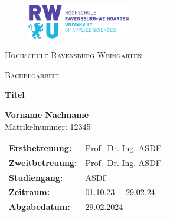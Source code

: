 \documentclass[a4paper, 12pt]{article}
\numberwithin{figure}{subsection}
\numberwithin{equation}{subsection}
\numberwithin{table}{subsection}
\begin{document}
\thispagestyle{empty} %


\begin{titlingpage}
    \begin{center}
        \begin{figure}[t]
            \centering
            \includegraphics[width=0.4\textwidth]{media/logos/rwu_logo.pdf}
            \hfill
        \end{figure}
        \vspace*{1.5cm}
            {\scshape\LARGE Hochschule Ravensburg Weingarten \par}
            \vspace{1cm}
	        {\scshape\Large Bacheloarbeit\par}
            \vspace{1.5cm}
            \begin{huge}
                {\huge\bfseries Titel \par}
            \end{huge}
            \begin{large}
                \vspace{2.5cm}
                \Large\textbf{Vorname Nachname}\\
                Matrikelnummer: 12345\\
            \end{large}
    \end{center}

    \vspace{2.5cm}
    \begin{onehalfspace}
    \begin{large}
    \begin{tabular}{l l}
        \textbf{Erstbetreuung:} & Prof.~Dr.-Ing. ASDF\\
        \textbf{Zweitbetreuung:} & Prof.~Dr.-Ing. ASDF\\
        \textbf{Studiengang:} & ASDF\\
        \textbf{Zeitraum:} & 01.10.23~-~29.02.24\\
        \textbf{Abgabedatum:} & 29.02.2024
    \end{tabular}
    \end{large}
    \end{onehalfspace}

\end{titlingpage}
\end{document}
